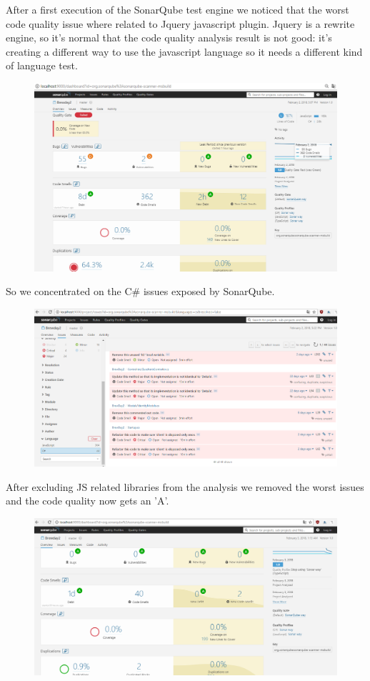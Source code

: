 \documentclass[12pt]{article}
\begin{document}
After a first execution of the SonarQube test engine we noticed that the worst code quality issue where related to Jquery javascript plugin.
Jquery is a rewrite engine, so it's normal that the code quality analysis result is not good: it's creating a different way
to use the javascript language so it needs a different kind of language test.
\begin{figure}[H]
\includegraphics[scale=0.5]{sonar1.png}
\end{figure}
So we concentrated on the C\# issues exposed by SonarQube.
\begin{figure}[H]
\includegraphics[scale=0.5]{sonar2.png}
\end{figure}
After excluding JS related libraries from the analysis we removed the worst issues and the code quality now gets an 'A'.
\begin{figure}[H]
\includegraphics[scale=0.5]{sonar3.png}
\end{figure}
\end{document}
